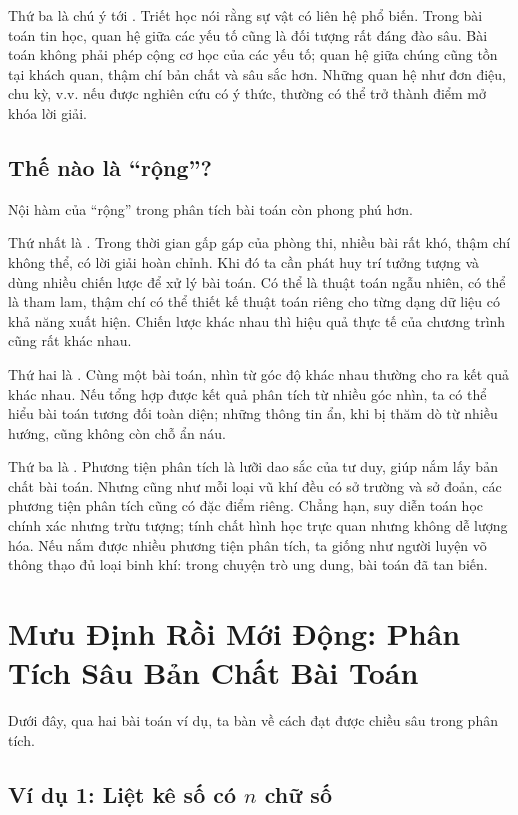 \documentclass[11pt]{article}
\begin{document}
Thứ ba là chú ý tới . Triết học nói rằng sự vật
có liên hệ phổ biến. Trong bài toán tin học, quan hệ giữa các yếu tố cũng là
đối tượng rất đáng đào sâu. Bài toán không phải phép cộng cơ học của các yếu
tố; quan hệ giữa chúng cũng tồn tại khách quan, thậm chí bản chất và sâu sắc
hơn. Những quan hệ như đơn điệu, chu kỳ, v.v. nếu được nghiên cứu có ý thức,
thường có thể trở thành điểm mở khóa lời giải.

\subsection{Thế nào là ``rộng''?}

Nội hàm của ``rộng'' trong phân tích bài toán còn phong phú hơn.

Thứ nhất là . Trong thời gian gấp gáp của phòng thi, nhiều
bài rất khó, thậm chí không thể, có lời giải hoàn chỉnh. Khi đó ta cần phát
huy trí tưởng tượng và dùng nhiều chiến lược để xử lý bài toán. Có thể là
thuật toán ngẫu nhiên, có thể là tham lam, thậm chí có thể thiết kế thuật toán
riêng cho từng dạng dữ liệu có khả năng xuất hiện. Chiến lược khác nhau thì
hiệu quả thực tế của chương trình cũng rất khác nhau.

Thứ hai là . Cùng một bài toán, nhìn từ góc độ khác nhau
thường cho ra kết quả khác nhau. Nếu tổng hợp được kết quả phân tích từ nhiều
góc nhìn, ta có thể hiểu bài toán tương đối toàn diện; những thông tin ẩn, khi
bị thăm dò từ nhiều hướng, cũng không còn chỗ ẩn náu.

Thứ ba là . Phương tiện phân tích là
lưỡi dao sắc của tư duy, giúp nắm lấy bản chất bài toán. Nhưng cũng như mỗi
loại vũ khí đều có sở trường và sở đoản, các phương tiện phân tích cũng có
đặc điểm riêng. Chẳng hạn, suy diễn toán học chính xác nhưng trừu tượng; tính
chất hình học trực quan nhưng không dễ lượng hóa. Nếu nắm được nhiều phương
tiện phân tích, ta giống như người luyện võ thông thạo đủ loại binh khí: trong
chuyện trò ung dung, bài toán đã tan biến.

\section{Mưu Định Rồi Mới Động: Phân Tích Sâu Bản Chất Bài Toán}

Dưới đây, qua hai bài toán ví dụ, ta bàn về cách đạt được chiều sâu trong phân
tích.

\subsection{Ví dụ 1: Liệt kê số có \texorpdfstring{\(n\)}{n} chữ số}
\end{document}
